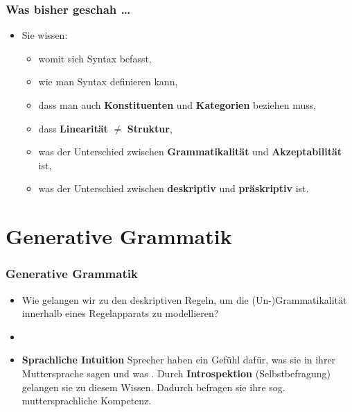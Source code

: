 \begin{frame}
\frametitle{Was bisher geschah \dots }

\begin{itemize}
	\item Sie wissen:
	\begin{itemize}
		\item womit sich Syntax befasst,
		\item wie man Syntax definieren kann,
		\item dass man auch \textbf{Konstituenten} und \textbf{Kategorien} beziehen muss,
		\item dass \textbf{Linearität} $\neq$ \textbf{Struktur},
		\item was der Unterschied zwischen \textbf{Grammatikalität} und \textbf{Akzeptabilität} ist,
		\item was der Unterschied zwischen \textbf{deskriptiv} und \textbf{präskriptiv} ist.
	\end{itemize}
\end{itemize}

\end{frame}


\section{Generative Grammatik}


\begin{frame}
\frametitle{Generative Grammatik}

\begin{itemize}
	\item Wie gelangen wir zu den deskriptiven Regeln, um die (Un-)Grammatikalität innerhalb eines Regelapparats zu modellieren?

\pause

	\item[]
	\item  \textbf{Sprachliche Intuition} \ras Sprecher haben ein Gefühl dafür, was sie in ihrer Muttersprache sagen  und was . Durch \textbf{Introspektion} (Selbstbefragung) gelangen sie zu diesem Wissen. Dadurch befragen sie ihre sog. muttersprachliche Kompetenz.

\end{itemize}

\end{frame}


